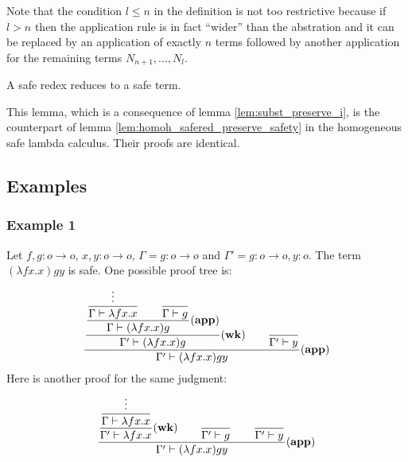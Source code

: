 Note that the condition $l\leq n$ in the definition is not too
restrictive because if $l>n$ then the application rule is in fact ``wider'' than the abstration
and it can be replaced by an application of exactly $n$ terms
followed by another application for the remaining terms $N_{n+1},
\ldots, N_l$.





\begin{lem}
\label{lem:safereduction} A safe redex reduces to a safe term.
\end{lem}

This lemma, which is a consequence of lemma \ref{lem:subst_preserve_i}, is the counterpart of lemma \ref{lem:homoh_safered_preserve_safety} in the homogeneous safe lambda calculus.
Their proofs are identical.

\subsection{Examples}
\subsubsection{Example 1}
Let $f,g:o\rightarrow o$, $x,y:o\rightarrow
o$, $\Gamma = g:o\rightarrow o$ and $\Gamma' = g:o\rightarrow o,
y:o$. The term $(\lambda f x . x) g y $ is safe. One possible proof tree is:
$$ \frac{\displaystyle 
        \frac{\displaystyle 
            \frac{\displaystyle 
                \frac{\displaystyle \vdots}{\Gamma \vdash \lambda f x. x}      \qquad \frac{\displaystyle}{\Gamma \vdash g} }{\Gamma \vdash (\lambda f x. x) g} \mathbf{(app)}
        }{ \Gamma' \vdash (\lambda f x. x) g } \mathbf{(wk)}
        \qquad \frac{\displaystyle}{\Gamma' \vdash y}
    }{ \Gamma' \vdash (\lambda f x. x) g y } \mathbf{(app)}
$$
Here is another proof for the same judgment:
$$ \frac{\displaystyle   \frac{\displaystyle  \frac{\displaystyle \vdots}{\Gamma \vdash \lambda f x. x} }{\Gamma' \vdash \lambda f x. x} \mathbf{(wk)}    \qquad \frac{\displaystyle }{\Gamma' \vdash g} \qquad \frac{\displaystyle }{\Gamma' \vdash y}}{\Gamma' \vdash (\lambda f x. x) g y } \mathbf{(app)}$$


